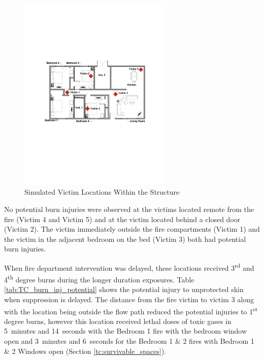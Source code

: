 \documentclass[12pt,oneside]{book}
\begin{document}
\begin{figure}[H]
\centering
\includegraphics[width=0.65\textwidth]{../0_Images/Instrumentation/Victim_Locations_New}
\caption{Simulated Victim Locations Within the Structure}
\label{fig:TC_Victim_Locations}
\end{figure}

No potential burn injuries were observed at the victims located remote from the fire (Victim 4 and Victim 5) and at the victim located behind a closed door (Victim 2). The victim immediately outside the fire compartments (Victim 1) and the victim in the adjacent bedroom on the bed (Victim 3) both had potential burn injuries. 

When fire department intervention was delayed, these locations received 3\textsuperscript{rd} and 4\textsuperscript{th} degree burns during the longer duration exposures. Table \ref{tab:TC_burn_inj_potential} shows the potential injury to unprotected skin when suppression is delayed. The distance from the fire victim to victim 3 along with the location being outside the flow path reduced the potential injuries to 1\textsuperscript{st} degree burns, however this location received lethal doses of toxic gases in 5~minutes and 14~seconds with the Bedroom 1 fire with the bedroom window open and 3~minutes and 6~seconds for the Bedroom 1 \& 2 fires with Bedroom 1 \& 2 Windows open (Section \ref{tc:survivable_spaces}). 
\end{document}
